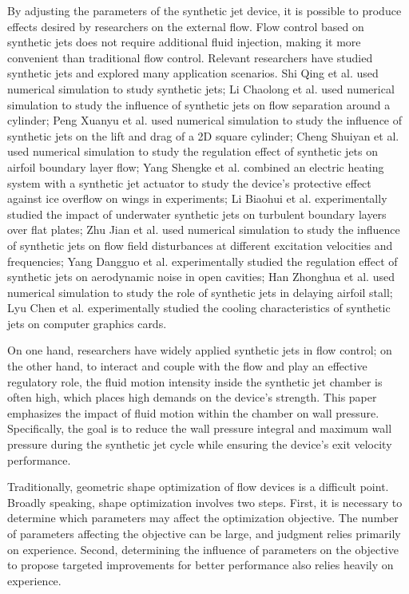 \documentclass{article}
\begin{document}
By adjusting the parameters of the synthetic jet device, it is possible to produce effects desired by researchers on the external flow.
Flow control based on synthetic jets does not require additional fluid injection, making it more convenient than traditional flow control.
Relevant researchers have studied synthetic jets and explored many application scenarios. 
Shi Qing et al. used numerical simulation to study synthetic jets;
Li Chaolong et al. used numerical simulation to study the influence of synthetic jets on flow separation around a cylinder;
Peng Xuanyu et al. used numerical simulation to study the influence of synthetic jets on the lift and drag of a 2D square cylinder;
Cheng Shuiyan et al. used numerical simulation to study the regulation effect of synthetic jets on airfoil boundary layer flow;
Yang Shengke et al. combined an electric heating system with a synthetic jet actuator to study the device's protective effect against ice overflow on wings in experiments;
Li Biaohui et al. experimentally studied the impact of underwater synthetic jets on turbulent boundary layers over flat plates;
Zhu Jian et al. used numerical simulation to study the influence of synthetic jets on flow field disturbances at different excitation velocities and frequencies;
Yang Dangguo et al. experimentally studied the regulation effect of synthetic jets on aerodynamic noise in open cavities;
Han Zhonghua et al. used numerical simulation to study the role of synthetic jets in delaying airfoil stall;
Lyu Chen et al. experimentally studied the cooling characteristics of synthetic jets on computer graphics cards.

On one hand, researchers have widely applied synthetic jets in flow control;
on the other hand, to interact and couple with the flow and play an effective regulatory role, the fluid motion intensity inside the synthetic jet chamber is often high, which places high demands on the device's strength.
This paper emphasizes the impact of fluid motion within the chamber on wall pressure.
Specifically, the goal is to reduce the wall pressure integral and maximum wall pressure during the synthetic jet cycle while ensuring the device's exit velocity performance.

Traditionally, geometric shape optimization of flow devices is a difficult point.
Broadly speaking, shape optimization involves two steps.
First, it is necessary to determine which parameters may affect the optimization objective.
The number of parameters affecting the objective can be large, and judgment relies primarily on experience.
Second, determining the influence of parameters on the objective to propose targeted improvements for better performance also relies heavily on experience.
\end{document}

